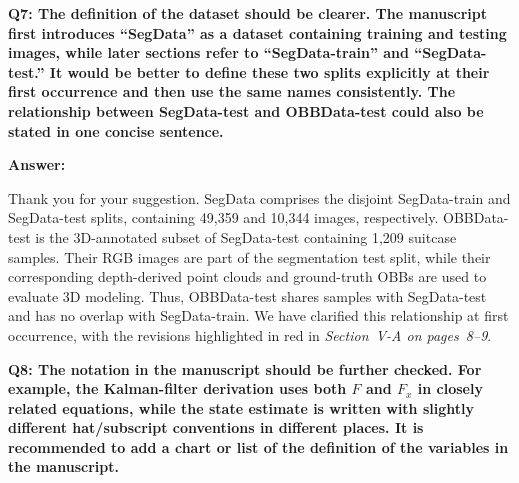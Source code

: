 \documentclass[journal,10pt]{IEEEtran}
\newcommand{\question}[2]{%
  \par\smallskip\noindent
  {\color{responseblue}\bfseries\clubpenalty=10000\widowpenalty=10000 Q#1: #2\par}%
  \par\nobreak\noindent
}
\newcommand{\answer}{%
  \par\smallskip\noindent
  \textbf{Answer: }\ignorespaces
}
\begin{document}
\question{7}{The definition of the dataset should be clearer. The manuscript first introduces “SegData” as a dataset containing training and testing images, while later sections refer to “SegData-train” and “SegData-test.” It would be better to define these two splits explicitly at their first occurrence and then use the same names consistently. The relationship between SegData-test and OBBData-test could also be stated in one concise sentence.}

\answer
Thank you for your suggestion. SegData comprises the disjoint SegData-train and SegData-test splits, containing 49,359 and 10,344 images, respectively. OBBData-test is the 3D-annotated subset of SegData-test containing 1,209 suitcase samples. Their RGB images are part of the segmentation test split, while their corresponding depth-derived point clouds and ground-truth OBBs are used to evaluate 3D modeling. Thus, OBBData-test shares samples with SegData-test and has no overlap with SegData-train. We have clarified this relationship at first occurrence, with the revisions highlighted in red in \textit{Section~V-A on pages~8--9}.

\question{8}{The notation in the manuscript should be further checked. For example, the Kalman-filter derivation uses both $F$ and $F_x$ in closely related equations, while the state estimate is written with slightly different hat/subscript conventions in different places. It is recommended to add a chart or list of the definition of the variables in the manuscript.}
\end{document}
